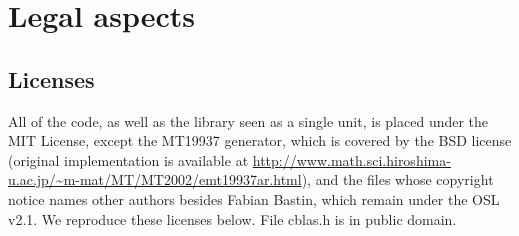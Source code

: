 \chapter{Legal aspects}

\section{Licenses}

\label{sec:license}

All of the code, as well as the library seen as a single unit,
is placed under the MIT License, except the MT19937
generator, which is covered by the BSD license (original
implementation is available at
\url{http://www.math.sci.hiroshima-u.ac.jp/~m-mat/MT/MT2002/emt19937ar.html}),
and the files whose copyright notice names other authors besides
Fabian Bastin, which remain under the OSL v2.1.
We reproduce these licenses below.
File {\sf cblas.h} is in public domain.

